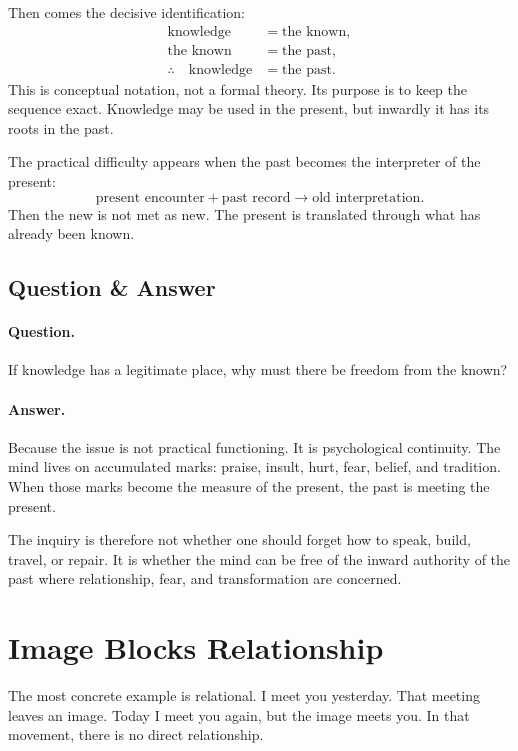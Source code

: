 \documentclass[11pt,oneside]{book}
\begin{document}
Then comes the decisive identification:
\begin{align}
\text{knowledge} &= \text{the known},\\
\text{the known} &= \text{the past},\\
\therefore\quad \text{knowledge} &= \text{the past}.
\end{align}
This is conceptual notation, not a formal theory. Its purpose is to keep the sequence exact. Knowledge may be used in the present, but inwardly it has its roots in the past.

The practical difficulty appears when the past becomes the interpreter of the present:
\begin{equation}
\text{present encounter}
+
\text{past record}
\longrightarrow
\text{old interpretation}.
\end{equation}
Then the new is not met as new. The present is translated through what has already been known.

\subsection{Question \& Answer}

\paragraph{Question.}
If knowledge has a legitimate place, why must there be freedom from the known?

\paragraph{Answer.}
Because the issue is not practical functioning. It is psychological continuity. The mind lives on accumulated marks: praise, insult, hurt, fear, belief, and tradition. When those marks become the measure of the present, the past is meeting the present.

The inquiry is therefore not whether one should forget how to speak, build, travel, or repair. It is whether the mind can be free of the inward authority of the past where relationship, fear, and transformation are concerned.

\section{Image Blocks Relationship}

The most concrete example is relational. I meet you yesterday. That meeting leaves an image. Today I meet you again, but the image meets you. In that movement, there is no direct relationship.
\end{document}
